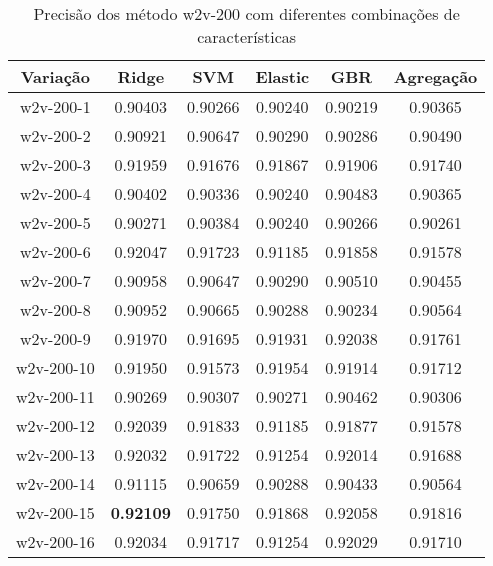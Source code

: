\begin{table}[H]
\centering
\begin{tabular}{|c| c c  c  c  c| }
\hline
Variação &  Ridge & SVM & Elastic & GBR & Agregação  \\ 
\hline
w2v-200-1 & 0.90403 & 0.90266 & 0.90240 & 0.90219 & 0.90365 \\
\hline
w2v-200-2 & 0.90921 & 0.90647 & 0.90290 & 0.90286 & 0.90490 \\
\hline
w2v-200-3 & 0.91959 & 0.91676 & 0.91867 & 0.91906 & 0.91740 \\
\hline
w2v-200-4 & 0.90402 & 0.90336 & 0.90240 & 0.90483 & 0.90365 \\
\hline
w2v-200-5 & 0.90271 & 0.90384 & 0.90240 & 0.90266 & 0.90261 \\
\hline
w2v-200-6 & 0.92047 & 0.91723 & 0.91185 & 0.91858 & 0.91578 \\
\hline
w2v-200-7 & 0.90958 & 0.90647 & 0.90290 & 0.90510 & 0.90455 \\
\hline
w2v-200-8 & 0.90952 & 0.90665 & 0.90288 & 0.90234 & 0.90564 \\
\hline
w2v-200-9 & 0.91970 & 0.91695 & 0.91931 & 0.92038 & 0.91761 \\
\hline
w2v-200-10 & 0.91950 & 0.91573 & 0.91954 & 0.91914 & 0.91712 \\
\hline
w2v-200-11 & 0.90269 & 0.90307 & 0.90271 & 0.90462 & 0.90306 \\
\hline
w2v-200-12 & 0.92039 & 0.91833 & 0.91185 & 0.91877 & 0.91578 \\
\hline
w2v-200-13 & 0.92032 & 0.91722 & 0.91254 & 0.92014 & 0.91688 \\
\hline
w2v-200-14 & 0.91115 & 0.90659 & 0.90288 & 0.90433 & 0.90564 \\
\hline
w2v-200-15 & \textbf{0.92109} & 0.91750 & 0.91868 & 0.92058 & 0.91816 \\
\hline
w2v-200-16 & 0.92034 & 0.91717 & 0.91254 & 0.92029 & 0.91710 \\
\hline
\end{tabular}
\caption{Precisão dos método w2v-200 com diferentes combinações de características}
\label{tab:precisionw2v200}
\end{table}

